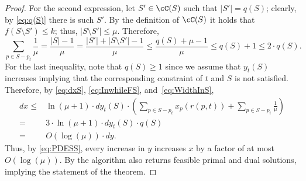 \begin{proof}
	For the second expression, let $S' \in \cC(S)$ such that $|S'| = q(S)$; clearly, by \eqref{eq:q(S)} there is such $S'$. By the definition of $\cC(S)$ it holds that $f(S \setminus S') \leq k$; thus, $|S \setminus S'| \leq \mu$. Therefore,  
	\begin{equation}
		\label{eq:WidthInS}
		\sum_{p \in S-p_t} \frac{1}{\mu} = \frac{ \left| S \right|-1}{\mu} = \frac{ \left| S' \right|+\left|S \setminus S'\right|-1}{\mu} \leq \frac{ q(S)+\mu-1}{\mu} \leq q(S)+1 \leq 2 \cdot q(S).  
	\end{equation} For the last inequality, note that $q(S) \geq 1$ since we assume that $y_t(S)$ increases implying that the corresponding constraint of $t$ and $S$ is not satisfied. Therefore, by \eqref{eq:dxS}, \eqref{eq:InwhileFS}, and~\eqref{eq:WidthInS},
	\begin{equation}
		\label{eq:PDESS}
		\begin{aligned}
			dx \leq{} &  \ln \left(\mu+1 \right) \cdot d y_t(S) \cdot  \left(	\sum_{p \in S-p_t} x_p(r(p,t)) + 	\sum_{p \in S-p_t} \frac{1}{\mu} \right) \\
			={} & 3 \cdot \ln \left(\mu+1 \right) \cdot d y_t(S) \cdot q(S)\\
			={} & O(\log (\mu)) \cdot dy.
		\end{aligned}
	\end{equation} Thus, by \eqref{eq:PDESS}, every increase in $y$ increases $x$ by a factor of at most $O(\log (\mu))$. By  the algorithm also returns feasible primal and dual solutions, implying the statement of the theorem.  
\end{proof}